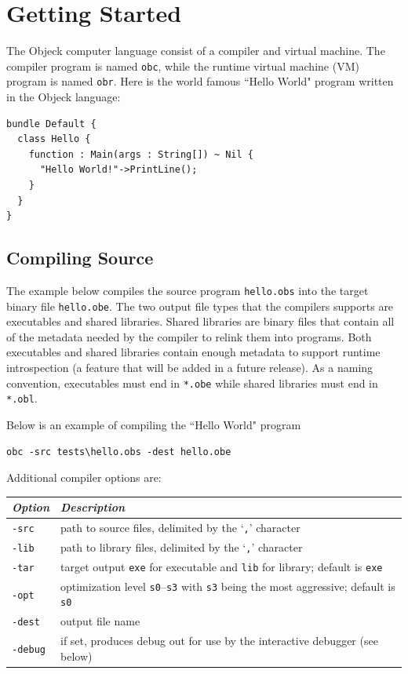 \documentclass[12pt]{article}
\begin{document}
\section{Getting Started}

The Objeck computer language consist of a compiler and virtual machine.  The compiler program is named \texttt{obc}, while the runtime virtual machine (VM) program is named \texttt{obr}.  Here is the world famous ``Hello World" program written in the Objeck language:

\begin{verbatim}
bundle Default {
  class Hello {
    function : Main(args : String[]) ~ Nil {
      "Hello World!"->PrintLine();
    }
  }
}
\end{verbatim}

\subsection{Compiling Source}
The example below compiles the source program \texttt{hello.obs} into the target binary file \texttt{hello.obe}.  The two output file types that the compilers supports are executables and shared libraries.  Shared libraries are binary files that contain all of the metadata needed by the compiler to relink them into programs.  Both executables and shared libraries contain enough metadata to support runtime introspection (a feature that will be added in a future release).  As a naming convention, executables must end in \texttt{*.obe} while shared libraries must end in \texttt{*.obl}.

Below is an example of compiling the ``Hello World" program
\begin{verbatim}
obc -src tests\hello.obs -dest hello.obe
\end{verbatim}

Additional compiler options are:
\begin{center}
\begin{tabular}{| l | l |}
\hline
\emph{Option} & \emph{Description} \\ \hline \hline
\texttt{-src} & path to source files, delimited by the `\texttt{,}' character \\ \hline
\texttt{-lib} & path to library files, delimited by the `\texttt{,}' character \\ \hline
\texttt{-tar} & target output \texttt{exe} for executable and \texttt{lib} for library; default is  \texttt{exe} \\ \hline
\texttt{-opt} & optimization level \texttt{s0}--\texttt{s3} with \texttt{s3} being the most aggressive; default is \texttt{s0} \\ \hline
\texttt{-dest} & output file name \\ \hline
\texttt{-debug} & if set, produces debug out for use by the interactive debugger (see below) \\ \hline
\end{tabular}
\end{center}
\end{document}
